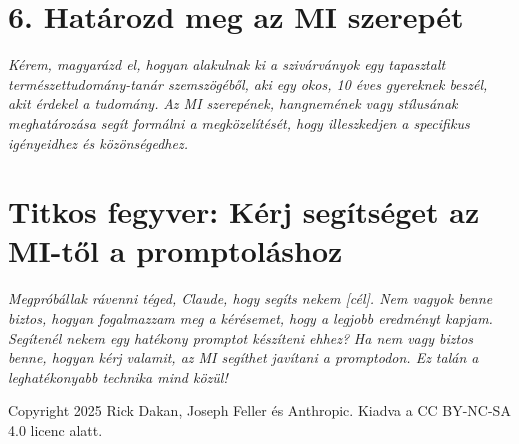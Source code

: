 \documentclass[a4paper, 11pt]{article}
\begin{document}
\section*{6. Határozd meg az MI szerepét}
\textit{Kérem, magyarázd el, hogyan alakulnak ki a szivárványok egy tapasztalt természettudomány-tanár szemszögéből, aki egy okos, 10 éves gyereknek beszél, akit érdekel a tudomány.}
\textit{Az MI szerepének, hangnemének vagy stílusának meghatározása segít formálni a megközelítését, hogy illeszkedjen a specifikus igényeidhez és közönségedhez.}

\section*{Titkos fegyver: Kérj segítséget az MI-től a promptoláshoz}
\textit{Megpróbállak rávenni téged, Claude, hogy segíts nekem [cél]. Nem vagyok benne biztos, hogyan fogalmazzam meg a kérésemet, hogy a legjobb eredményt kapjam. Segítenél nekem egy hatékony promptot készíteni ehhez?}
\textit{Ha nem vagy biztos benne, hogyan kérj valamit, az MI segíthet javítani a promptodon. Ez talán a leghatékonyabb technika mind közül!}

\vspace{\fill}
\begin{center}
    \small{Copyright 2025 Rick Dakan, Joseph Feller és Anthropic. Kiadva a CC BY-NC-SA 4.0 licenc alatt.}
\end{center}
\end{document}
